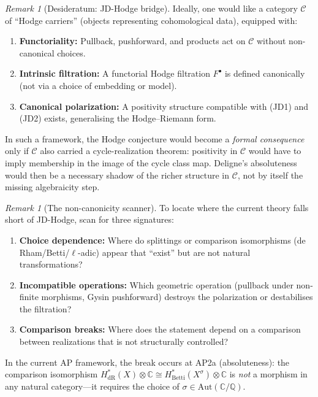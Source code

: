 \documentclass[aps,prd,twocolumn,superscriptaddress,nofootinbib]{revtex4-2}
\theoremstyle{definition}
\theoremstyle{remark}
\newtheorem{remark}[theorem]{Remark}
\begin{document}
\begin{remark}[Desideratum: JD-Hodge bridge]\label{ax:jd-hodge}
Ideally, one would like a category $\mathcal{C}$ of ``Hodge carriers'' (objects representing cohomological data), equipped with:
\begin{enumerate}
\item[(JD1)] \textbf{Functoriality:} Pullback, pushforward, and products act on $\mathcal{C}$ without non-canonical choices.
\item[(JD2)] \textbf{Intrinsic filtration:} A functorial Hodge filtration $F^\bullet$ is defined canonically (not via a choice of embedding or model).
\item[(JD3)] \textbf{Canonical polarization:} A positivity structure compatible with (JD1) and (JD2) exists, generalising the Hodge--Riemann form.
\end{enumerate}
In such a framework, the Hodge conjecture would become a \emph{formal consequence} only if $\mathcal{C}$ also carried a cycle-realization theorem: positivity in $\mathcal{C}$ would have to imply membership in the image of the cycle class map. Deligne's absoluteness would then be a necessary shadow of the richer structure in $\mathcal{C}$, not by itself the missing algebraicity step.
\end{remark}

\begin{remark}[The non-canonicity scanner]\label{rem:noncanonicity-scanner}
To locate where the current theory falls short of JD-Hodge, scan for three signatures:
\begin{enumerate}
\item \textbf{Choice dependence:} Where do splittings or comparison isomorphisms (de Rham/Betti/$\ell$-adic) appear that ``exist'' but are not natural transformations?
\item \textbf{Incompatible operations:} Which geometric operation (pullback under non-finite morphisms, Gysin pushforward) destroys the polarization or destabilises the filtration?
\item \textbf{Comparison breaks:} Where does the statement depend on a comparison between realizations that is not structurally controlled?
\end{enumerate}
In the current AP framework, the break occurs at AP2a (absoluteness): the comparison isomorphism $H^*_{\mathrm{dR}}(X) \otimes \mathbb{C} \cong H^*_{\mathrm{Betti}}(X^\sigma) \otimes \mathbb{C}$ is \emph{not} a morphism in any natural category---it requires the choice of $\sigma \in \mathrm{Aut}(\mathbb{C}/\mathbb{Q})$.
\end{remark}
\end{document}
